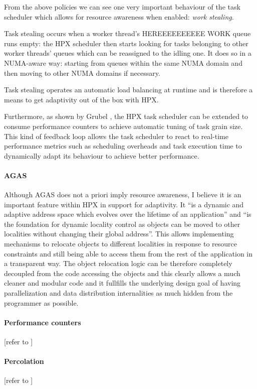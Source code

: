 From the above policies we can see one very important behaviour of the task scheduler which allows for resource awareness when enabled: \emph{work stealing}.

Task stealing occurs when a worker thread's HEREEEEEEEEEE WORK \TODO queue runs empty: the HPX scheduler then starts looking for tasks belonging to other worker threads' queues which can be reassigned to the idling one. It does so in a NUMA-aware way: starting from queues within the same NUMA domain and then moving to other NUMA domains if necessary.

Task stealing operates an automatic load balancing at runtime and is therefore a means to get adaptivity out of the box with HPX.

Furthermore, as shown by Grubel \cite{grubel2016dynamic}, the HPX task scheduler can be extended to consume performance counters to achieve automatic tuning of task grain size. This kind of feedback loop allows the task scheduler to react to real-time performance metrics such as scheduling overheads and task execution time to dynamically adapt its behaviour to achieve better performance.

\paragraph{AGAS}
Although AGAS does not a priori imply resource awareness, I believe it is an important feature within HPX in support for adaptivity. It ``is a dynamic and adaptive address space
which evolves over the lifetime of an application'' and ``is the foundation for
dynamic locality control as objects can be moved to other localities
without changing their global address''.\cite{kaiser2014hpx}
This allows implementing mechanisms to relocate objects to different localities in response to resource constraints and still being able to access them from the rest of the application in a transparent way. The object relocation logic can be therefore completely decoupled from the code accessing the objects and this clearly allows a much cleaner and modular code and it fullfills the underlying design goal of having parallelization and data distribution internalities as much hidden from the programmer as possible.

\paragraph{Performance counters}
[\TODO refer to \cite{grubel2016using}]

\paragraph{Percolation}
[\TODO refer to \cite{amatya2014parallel}]

